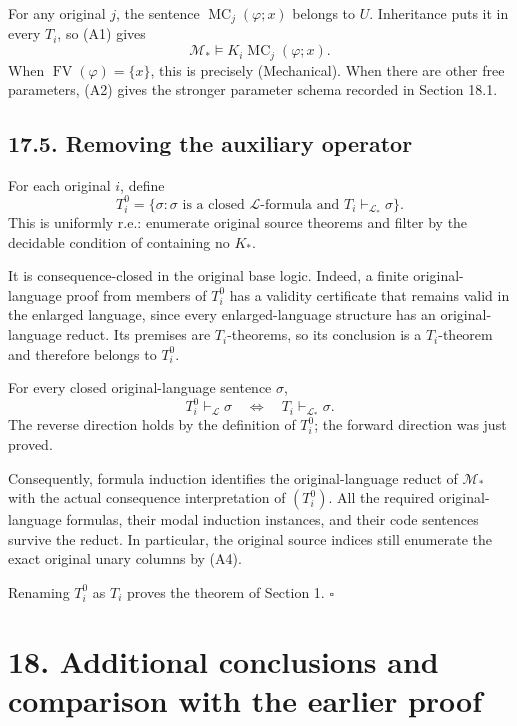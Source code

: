 \documentclass[
  11pt,
  letterpaper,
]{article}
\begin{document}
For any original \(j\), the sentence \(\operatorname{MC}_j(\varphi;x)\)
belongs to \(U\). Inheritance puts it in every \(T_i\), so (A1) gives \[
\mathcal M_*\models K_i\operatorname{MC}_j(\varphi;x).
\tag{A2}
\] When \(\operatorname{FV}(\varphi)=\{x\}\), this is precisely
(Mechanical). When there are other free parameters, (A2) gives the
stronger parameter schema recorded in Section 18.1.

\subsection{17.5. Removing the auxiliary
operator}\label{removing-the-auxiliary-operator}

For each original \(i\), define \[
T_i^0=
\{\sigma:\sigma\text{ is a closed }\mathcal L\text{-formula and }
                         T_i\vdash_{\mathcal L_*}\sigma\}.
\tag{A3}
\] This is uniformly r.e.: enumerate original source theorems and filter
by the decidable condition of containing no \(K_*\).

It is consequence-closed in the original base logic. Indeed, a finite
original-language proof from members of \(T_i^0\) has a validity
certificate that remains valid in the enlarged language, since every
enlarged-language structure has an original-language reduct. Its
premises are \(T_i\)-theorems, so its conclusion is a \(T_i\)-theorem
and therefore belongs to \(T_i^0\).

For every closed original-language sentence \(\sigma\), \[
T_i^0\vdash_{\mathcal L}\sigma
\quad\Longleftrightarrow\quad
T_i\vdash_{\mathcal L_*}\sigma.
\tag{A4}
\] The reverse direction holds by the definition of \(T_i^0\); the
forward direction was just proved.

Consequently, formula induction identifies the original-language reduct
of \(\mathcal M_*\) with the actual consequence interpretation of
\((T_i^0)\). All the required original-language formulas, their modal
induction instances, and their code sentences survive the reduct. In
particular, the original source indices still enumerate the exact
original unary columns by (A4).

Renaming \(T_i^0\) as \(T_i\) proves the theorem of Section 1.
\(\square\)

\section{18. Additional conclusions and comparison with the earlier
proof}\label{additional-conclusions-and-comparison-with-the-earlier-proof}
\end{document}
